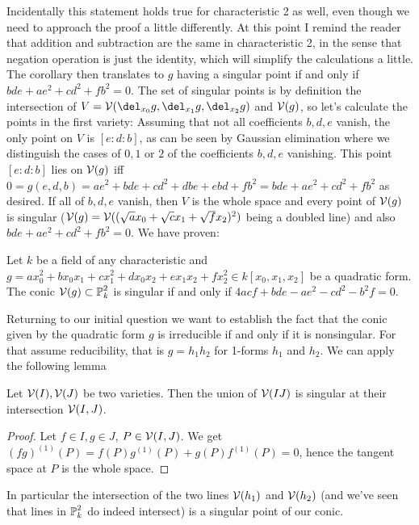 Incidentally this statement holds true for characteristic 2 as well, even though we need to approach the proof a little differently.
At this point I remind the reader that addition and subtraction are the same in characteristic 2, in the sense that negation operation is just the identity, which will simplify the calculations a little.
The corollary then translates to $g$ having a singular point if and only if $bde +ae^2 + cd^2 +fb^2 = 0$.
The set of singular points is by definition the intersection of $V = \V(\del_{x_0}g,\del_{x_1}g,\del_{x_2}g)$ and $\operatorname{\mathcal V}(g)$, so let's calculate the points in the first variety: Assuming that not all coefficients $b,d,e$ vanish, the only point on $V$ is $[e:d:b]$, as can be seen by Gaussian elimination where we distinguish the cases of $0,1$ or $2$ of the coefficients $b,d,e$ vanishing.
This point $[e:d:b]$ lies on $\operatorname{\mathcal V}(g)$ iff $0 = g(e,d,b) = ae^2 + bde + cd^2 + dbe + ebd + fb^2 = bde + ae^2 + cd^2 + fb^2$ as desired.
If all of $b,d,e$ vanish, then $V$ is the whole space and every point of $\operatorname{\mathcal V}(g)$ is singular ($\operatorname{\mathcal V}(g) = \operatorname{\mathcal V}((\sqrt{a}x_0 + \sqrt{c}x_1 + \sqrt{f}x_2)^2)$ being a doubled line) and also $bde + ae^2 + cd^2 + fb^2 = 0$. We have proven:

\begin{corollary} \label{corollarySingularConic}
Let $k$ be a field of any characteristic and $g = ax_0^2 + bx_0x_1 + cx_1^2 + dx_0x_2 + ex_1x_2 + fx_2^2
 \in k[x_0,x_1,x_2]$ be a quadratic form. The conic $\operatorname{\mathcal V}(g) \subset \operatorname{\mathbb P}^2_k$ is singular if and only if $4acf + bde - ae^2 - cd^2 - b^2f = 0$.
\end{corollary}


Returning to our initial question we want to establish the fact that the conic given by the quadratic form $g$ is irreducible if and only if it is nonsingular.
For that assume reducibility, that is $g = h_1h_2$ for 1-forms $h_1$ and $h_2$.
We can apply the following lemma
\begin{lemma} \label{lemmaSingularIntersect}
Let $\operatorname{\mathcal V}(I),\operatorname{\mathcal V}(J)$ be two varieties. Then the union of $\operatorname{\mathcal V}(IJ)$ is singular at their intersection $\operatorname{\mathcal V}(I,J)$.
\end{lemma}
\begin{proof}
Let $f\in I, g\in J$, $P\in \operatorname{\mathcal V}(I,J)$. We get $(fg)^{(1)}(P) = f(P)g^{(1)}(P) + g(P)f^{(1)}(P) = 0$, hence the tangent space at $P$ is the whole space.
\end{proof}
In particular the intersection of the two lines $\operatorname{\mathcal V}(h_1)$ and $\operatorname{\mathcal V}(h_2)$ (and we've seen that lines in $\operatorname{\mathbb P}^2_k$ do indeed intersect) is a singular point of our conic.


